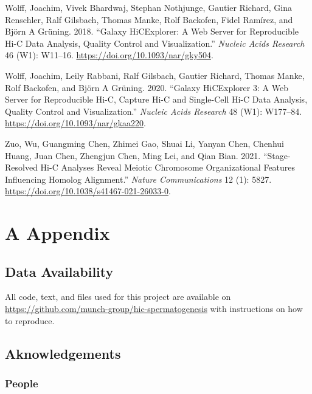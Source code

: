 \documentclass[
  11pt,
  a4paper,
]{scrbook}
\newlength{\cslhangindent}
\newenvironment{CSLReferences}[2] %
 {\begin{list}{}{%
  \setlength{\itemindent}{0pt}
  \setlength{\leftmargin}{0pt}
  \setlength{\parsep}{0pt}
  \ifodd #1
   \setlength{\leftmargin}{\cslhangindent}
   \setlength{\itemindent}{-1\cslhangindent}
  \fi
  \setlength{\itemsep}{#2\baselineskip}}}
 {\end{list}}
\begin{document}
\begin{CSLReferences}{1}{0}
Wolff, Joachim, Vivek Bhardwaj, Stephan Nothjunge, Gautier Richard, Gina
Renschler, Ralf Gilsbach, Thomas Manke, Rolf Backofen, Fidel Ramírez,
and Björn A Grüning. 2018. {``Galaxy {HiCExplorer}: A Web Server for
Reproducible {Hi-C} Data Analysis, Quality Control and Visualization.''}
\emph{Nucleic Acids Research} 46 (W1): W11--16.
\url{https://doi.org/10.1093/nar/gky504}.

Wolff, Joachim, Leily Rabbani, Ralf Gilsbach, Gautier Richard, Thomas
Manke, Rolf Backofen, and Björn A Grüning. 2020. {``Galaxy {HiCExplorer}
3: A Web Server for Reproducible {Hi-C}, Capture {Hi-C} and Single-Cell
{Hi-C} Data Analysis, Quality Control and Visualization.''}
\emph{Nucleic Acids Research} 48 (W1): W177--84.
\url{https://doi.org/10.1093/nar/gkaa220}.

Zuo, Wu, Guangming Chen, Zhimei Gao, Shuai Li, Yanyan Chen, Chenhui
Huang, Juan Chen, Zhengjun Chen, Ming Lei, and Qian Bian. 2021.
{``Stage-Resolved {Hi-C} Analyses Reveal Meiotic Chromosome
Organizational Features Influencing Homolog Alignment.''} \emph{Nature
Communications} 12 (1): 5827.
\url{https://doi.org/10.1038/s41467-021-26033-0}.

\end{CSLReferences}

\chapter*{A Appendix}\label{a-appendix}

\section*{Data Availability}\label{data-availability}

All code, text, and files used for this project are available on
\url{https://github.com/munch-group/hic-spermatogenesis} with
instructions on how to reproduce.

\section*{Aknowledgements}\label{aknowledgements}

\subsection*{People}\label{people}
\end{document}
